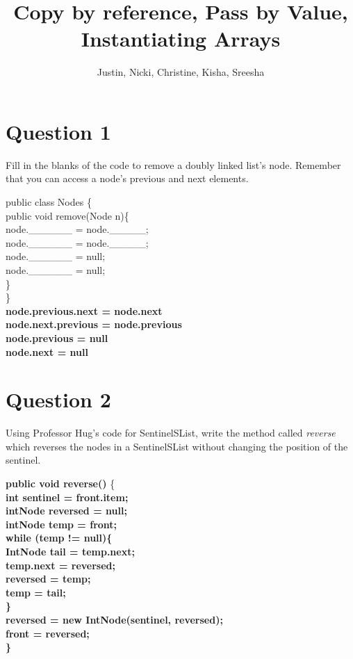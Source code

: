 \documentclass[11 pt, oneside]{article}
\title{Copy by reference, Pass by Value, Instantiating Arrays}
\author{Justin, Nicki, Christine, Kisha, Sreesha}
\date{}
\begin{document}
\maketitle
\section*{Question 1}
Fill in the blanks of the code to remove a doubly linked list's node. Remember that you can access a node's previous and next elements.

\begin{flushleft}
public class Nodes \{ \\	
\setlength\parindent{24pt} 
public void remove(Node n)\{ \\
\setlength\parindent{48pt} 
		node.\_\_\_\_\_\_ = node.\_\_\_\_\_; \\
		node.\_\_\_\_\_\_ = node.\_\_\_\_\_; \\
		node.\_\_\_\_\_\_ = null; \\
		node.\_\_\_\_\_\_ = null; \\
\setlength\parindent{24pt} 
	\} \\
\setlength\parindent{0pt} 	
\} \\
\textbf{node.previous.next = node.next} \\
\textbf{node.next.previous = node.previous} \\
\textbf{node.previous = null} \\
\textbf{node.next = null}
\end{flushleft}
\clearpage

\section*{Question 2}
Using Professor Hug's code for SentinelSList, write the method called \textit{reverse} which reverses the nodes in a SentinelSList without changing the position of the sentinel.

\begin{flushleft}
\textbf{public void reverse()} \{ \\
\setlength\parindent{12pt}
\textbf {int sentinel = front.item;\\
intNode reversed = null;\\
intNode temp = front;\\
\vspace{3mm}
\setlength\parindent{12pt}
while (temp != null)\{\\
\setlength\parindent{24pt}
IntNode tail = temp.next;\\
temp.next = reversed;\\
reversed = temp;\\
temp = tail;\\
\}\\
\setlength\parindent{12pt}
reversed = new IntNode(sentinel, reversed);\\
front = reversed;\\
\setlength\parindent{0pt}
\}}\\
\end{flushleft}
\end{document}
